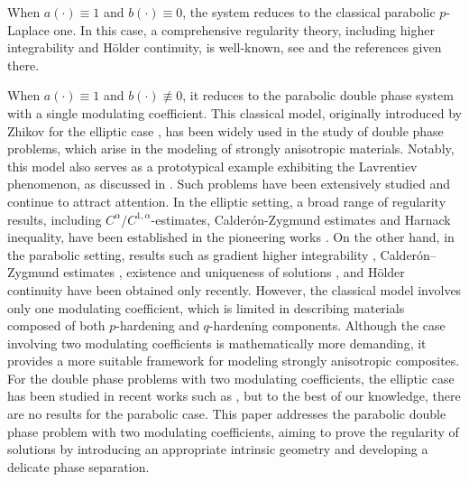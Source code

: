 \documentclass[11pt,oneside, english,reqno,twoside a4paper]{amsart}
\theoremstyle{definition}
\numberwithin{theorem}{section}
\numberwithin{equation}{section}
\begin{document}
When $a(\cdot) \equiv 1$ and $b(\cdot) \equiv 0$, the system reduces to the classical parabolic $p$-Laplace one. In this case, a comprehensive regularity theory, including higher integrability and H\"{o}lder continuity, is well-known, see \cite{DiBF84, DiBF85, DiBF_2_85, KL2002, 1993_Degenerate_parabolic_equations_DiBenedetto, phdthesis} and the references given there.

When $a(\cdot) \equiv 1$ and $b(\cdot) \not\equiv 0$, it reduces to the parabolic double phase system with a single modulating coefficient. This classical model, originally introduced by Zhikov for the elliptic case \cite{Zhikov1986, Zhikov1993, Zhikov1995, Zhikov1997}, has been widely used in the study of double phase problems, which arise in the modeling of strongly anisotropic materials. Notably, this model also serves as a prototypical example exhibiting the Lavrentiev phenomenon, as discussed in \cite{Esposito2004, Fonseca2004, Zhikov1993, Zhikov1995}. Such problems have been extensively studied and continue to attract attention. In the elliptic setting, a broad range of regularity results, including $C^{\alpha}/ C^{1, \alpha}$-estimates, Calder\'{o}n-Zygmund estimates and Harnack inequality, have been established in the pioneering works \cite{Baroni2015, Colombo2015, Colombo2016, Colombo2015a, DeFilippis2019, Baasandorj2020, Byun2020, Byun2017}. On the other hand, in the parabolic setting, results such as gradient higher integrability \cite{2023_Gradient_Higher_Integrability_for_Degenerate_Parabolic_Double-Phase_Systems, KS24}, Calder\'{o}n–Zygmund estimates \cite{kim2024calderonzygmundtypeestimateparabolic, kim2025calderonzygmundtypeestimatesingular}, existence and uniqueness of solutions \cite{ST16, Chlebicks2019}, and H\"{o}lder continuity \cite{KIM2025113231} have been obtained only recently.  However, the classical model involves only one modulating coefficient, which is limited in describing materials composed of both $p$-hardening and $q$-hardening components. Although the case involving two modulating coefficients is mathematically more demanding, it provides a more suitable framework for modeling strongly anisotropic composites. For the double phase problems with two modulating coefficients, the elliptic case has been studied in recent works such as \cite{KO24, Baroni2018, KO2025}, but to the best of our knowledge, there are no results for the parabolic case.
This paper addresses the parabolic double phase problem with two modulating coefficients, aiming to prove the regularity of solutions by introducing an appropriate intrinsic geometry and developing a delicate phase separation.
\end{document}
